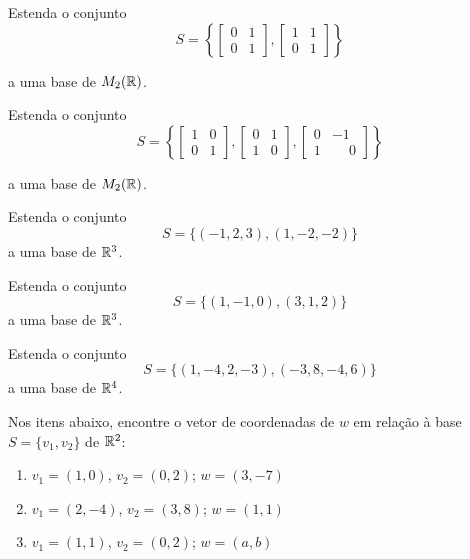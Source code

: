 \documentclass[12pt]{exam}
\begin{document}
    \begin{exercicio}
        Estenda o conjunto
        \[
            S = \left\{\begin{bmatrix}0 & 1\\0 & 1\end{bmatrix}, \begin{bmatrix}1 & 1\\0 & 1\end{bmatrix}\right\}
        \]
    \end{exercicio}
    a uma base de $M_2(\mathbb{R})$.

    \begin{exercicio}
        Estenda o conjunto
        \[
            S = \left\{\begin{bmatrix}1 & 0\\0 & 1\end{bmatrix}, \begin{bmatrix}0 & 1\\1 & 0\end{bmatrix}, \begin{bmatrix}0 & -1\\1 & \phantom{-}0\end{bmatrix}\right\}
        \]
    \end{exercicio}
    a uma base de $M_2(\mathbb{R})$.

    \begin{exercicio}
        Estenda o conjunto
        \[
            S = \{(-1, 2, 3), (1, -2, -2)\}
        \]
        a uma base de $\mathbb{R}^3$.
    \end{exercicio}

    \begin{exercicio}
        Estenda o conjunto
        \[
            S = \{(1, -1, 0), (3, 1, 2)\}
        \]
        a uma base de $\mathbb{R}^3$.
    \end{exercicio}

    \begin{exercicio}
        Estenda o conjunto
        \[
            S = \{(1, -4, 2, -3), (-3, 8, -4, 6)\}
        \]
        a uma base de $\mathbb{R}^4$.
    \end{exercicio}

    \begin{exercicio}
        Nos itens abaixo, encontre o vetor de coordenadas de $w$ em relação à base  $S = \{v_1, v_2\}$ de $\mathbb{R}^2$:
        \begin{enumerate}[label={\alph*})]
            \item $v_1 = (1, 0)$, $v_2 = (0, 2)$; $w = (3, -7)$
            \item $v_1 = (2, -4)$, $v_2 = (3, 8)$; $w = (1, 1)$
            \item $v_1 = (1, 1)$, $v_2 = (0, 2)$; $w = (a, b)$
        \end{enumerate}
    \end{exercicio}
\end{document}
